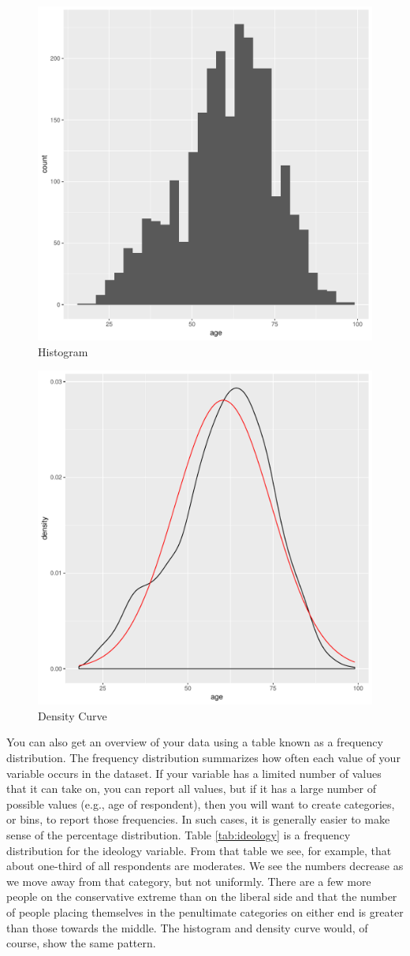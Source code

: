 \documentclass[11pt,openany]{book}\usepackage[]{graphicx}\usepackage[]{color}
\begin{document}
\begin{figure}
  \centering
  \includegraphics[width=.4\textwidth]{03_Data/rskhist.pdf}
  \caption{Histogram}
\end{figure}
\begin{figure}
  \centering
  \includegraphics[width=.4\textwidth]{03_Data/rskden.pdf}
  \caption{Density Curve
  \label{fig:rsk_2}}
\end{figure}
  

You can also get an overview of your data using a table known as a frequency distribution. The frequency distribution summarizes how often each value of your variable occurs in the dataset.  If your variable has a limited number of values that it can take on, you can report all values, but if it has a large number of possible values (e.g., age of respondent), then you will want to create categories, or bins, to report those frequencies. In such cases, it is generally easier to make sense of the percentage distribution.  Table \ref{tab:ideology} is a frequency distribution for the ideology variable.  From that table we see, for example, that about one-third of all respondents are moderates. We see the numbers decrease as we move away from that category, but not uniformly.  There are a few more people on the conservative extreme than on the liberal side and that the number of people placing themselves in the penultimate categories on either end is greater than those towards the middle.  The histogram and density curve would, of course, show the same pattern.
\end{document}
